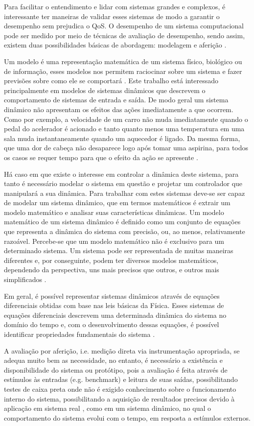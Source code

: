 Para facilitar o entendimento e lidar com sistemas grandes e complexos, é interessante ter maneiras de validar esses sistemas de modo a garantir o desempenho sem prejudica o QoS. O desempenho de um sistema computacional pode ser medido por meio de técnicas de avaliação de desempenho, sendo assim, existem duas possibilidades básicas de abordagem: modelagem e aferição \cite{Jain1991}.

Um modelo é uma representação matemática de um sistema físico, biológico ou de informação, esses modelos nos permitem raciocinar sobre um sistema e fazer previsões sobre como ele se comportará \cite{Karl2008}. Este trabalho está interessado principalmente em modelos de sistemas dinâmicos que descrevem o comportamento de sistemas de entrada e saída. De modo geral um sistema dinâmico não apresentam os efeitos das ações imediatamente a que ocorrem. Como por exemplo, a velocidade de um carro não muda imediatamente quando o pedal do acelerador é acionado e tanto quanto menos uma temperatura em uma sala muda instantaneamente quando um aquecedor é ligado. Da mesma forma, que uma dor de cabeça não desaparece logo após tomar uma aspirina, para todos os casos se requer tempo para que o efeito da ação se apresente \cite{Karl2008}.

Há caso em que existe o interesse em controlar a dinâmica deste sistema, para tanto é necessário modelar o sistema em questão e projetar um controlador que manipulará a sua dinâmica. Para trabalhar com estes sistemas deve-se ser capaz de modelar um sistema dinâmico, que em termos matemáticos é extrair um modelo matemático e analisar suas características dinâmicas. Um modelo matemático de um sistema dinâmico é definido como um conjunto de equações que representa a dinâmica do sistema com precisão, ou, ao menos, relativamente razoável. Percebe-se que um modelo matemático não é exclusivo para um determinado sistema. Um sistema pode ser representada de muitas maneiras diferentes e, por conseguinte, podem ter diversos modelos matemáticos, dependendo da perspectiva, uns mais precisos que outros, e outros mais simplificados \cite{Ogata2001}.

Em geral, é possível representar sistemas dinâmicos através de equações diferenciais obtidas com base nas leis básicas da Física. Esses sistemas de equações diferenciais descrevem uma determinada dinâmica do sistema no domínio do tempo e, com o desenvolvimento dessas equações, é possível identificar propriedades fundamentais do sistema \cite{Nobile2013}.


A avaliação por aferição, i.e. medição direta via instrumentação apropriada, se adequa muito bem as necessidade, no entanto, é necessário a existência e disponibilidade do sistema ou protótipo, pois a avaliação é feita através de estímulos às entradas (e.g. benchmark) e leitura de suas saídas, possibilitando testes de caixa preta onde não é exigido conhecimento sobre o funcionamento interno do sistema, possibilitando a aquisição de resultados precisos devido à aplicação em sistema real \cite{Nobile2013}, como em um sistema dinâmico, no qual o comportamento do sistema evolui com o tempo, em resposta a estímulos externos.

